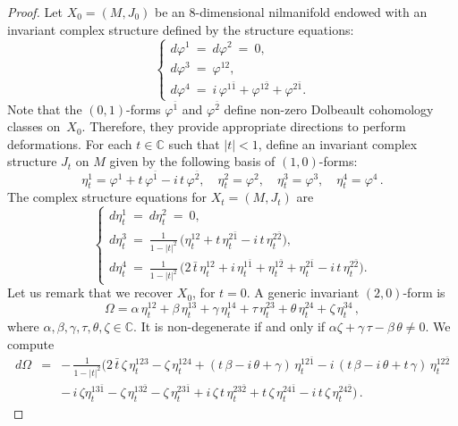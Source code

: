 \documentclass[a4paper]{amsart}
\theoremstyle{definition}
\theoremstyle{remark}
\numberwithin{equation}{section}
\begin{document}
\begin{proof}
Let $X_{0}=(M,J_{0})$ be an $8$-dimensional nilmanifold endowed with an invariant complex structure defined
by the structure equations:
\[
\left\{\begin{array}{l}
d\varphi^1 \ = \ d\varphi^2 \ = \ 0,\\
d\varphi^3 \ = \ \varphi^{12},\\
d\varphi^4 \ = \ i\,\varphi^{1\bar1}+\varphi^{1\bar2}+\varphi^{2\bar1}.
\end{array}\right.
\]
Note that the $(0,1)$-forms $\varphi^{\bar1}$ and $\varphi^{\bar 2}$ define non-zero Dolbeault cohomology classes on~$X_{0}$. Therefore, they provide appropriate directions to perform deformations. For each $t\in\mathbb C$ such that $|t|<1$, define an invariant complex structure $J_{t}$ on $M$ given by the following
basis of $(1,0)$-forms:
\[
\eta_t^1=\varphi^1+t\,\varphi^{\bar1}-i\,t\,\varphi^{\bar2}, \quad \eta_t^2=\varphi^2, \quad 
    \eta_t^3=\varphi^3, \quad \eta_t^4=\varphi^4\,.
\]
The complex structure equations for $X_{t}=(M,J_{t})$ are
\begin{equation}\label{def-hs-no-cerrada}
\left\{\begin{array}{l}
d\eta_t^1 \ = \ d\eta_t^2 \ = \ 0,\\
d\eta_t^3 \ = \ \frac{1}{1-|t|^2}\,\big(\eta_t^{12}+t\,\eta_t^{2\bar1}-i\,t\,\eta_t^{2\bar2}\big),\\
d\eta_t^4 \ = \ \frac{1}{1-|t|^2}\,\big(2\,\bar t\,\eta_t^{12}+i\,\eta_t^{1\bar1}
   +\eta_t^{1\bar2}+\eta_t^{2\bar1}-i\,t\,\eta_t^{2\bar2} \big).
\end{array}\right.
\end{equation}
Let us remark that we recover $X_{0}$, for $t=0$. A generic invariant $(2,0)$-form is
\[
\Omega=\alpha\,\eta_t^{12}+\beta\,\eta_t^{13}+\gamma\,\eta_t^{14}+\tau\,\eta_t^{23}
    +\theta\,\eta_t^{24}+\zeta\,\eta_t^{34}\,,
\]
where $\alpha,\beta,\gamma,\tau,\theta,\zeta\in\mathbb C$. It is non-degenerate if and only if $\alpha \zeta+\gamma\,\tau-\beta\,\theta\neq 0$. We compute
\[
\begin{array}{lcl}
d\Omega &=& -\,\frac{1}{1-|t|^2}\Big( 2\,\bar t\,\zeta\,\eta_t^{123} - \zeta\,\eta_t^{124} +
  (t\,\beta-i\,\theta+\gamma)\,\eta_t^{12\bar1} - i\,(t\,\beta-i\,\theta+t\,\gamma)\,\eta_t^{12\bar2}\\
&& -\,i\,\zeta\eta_t^{13\bar1}-\zeta\,\eta_t^{13\bar2}-\zeta\,\eta_t^{23\bar1}+i\,\zeta\,t\,\eta_t^{23\bar2}
  +t\,\zeta\,\eta_t^{24\bar1}-i\,t\,\zeta\,\eta_t^{24\bar2}\Big)\,.
\end{array}
\]
\end{proof}
\end{document}
